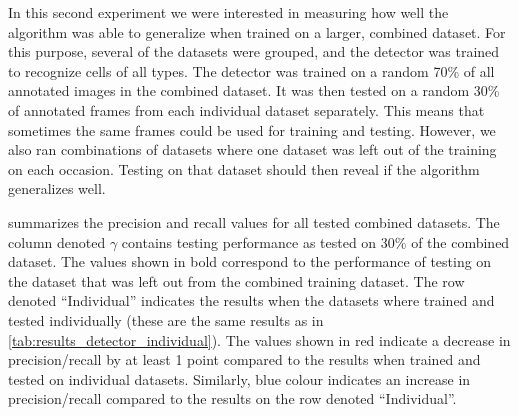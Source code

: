 		In this second experiment we were interested in measuring how well the algorithm was able to generalize when trained on a larger, combined dataset. For this purpose, several of the datasets were grouped, and the detector was trained to recognize cells of all types. The detector was trained on a random 70\% of all annotated images in the combined dataset. It was then tested on a random 30\% of annotated frames from each individual dataset separately. This means that sometimes the same frames could be used for training and testing. However, we also ran combinations of datasets where one dataset was left out of the training on each occasion. Testing on that dataset should then reveal if the algorithm generalizes well.
		
		 summarizes the precision and recall values for all tested combined datasets. The column denoted $\gamma$ contains testing performance as tested on 30\% of the combined dataset. The values shown in bold correspond to the performance of testing on the dataset that was left out from the combined training dataset. The row denoted ``Individual'' indicates the results when the datasets where trained and tested individually (these are the same results as in \cref{tab:results_detector_individual}). The values shown in red indicate a decrease in precision/recall by at least 1 point compared to the results when trained and tested on individual datasets. Similarly, blue colour indicates an increase in precision/recall compared to the results on the row denoted ``Individual''.
		
